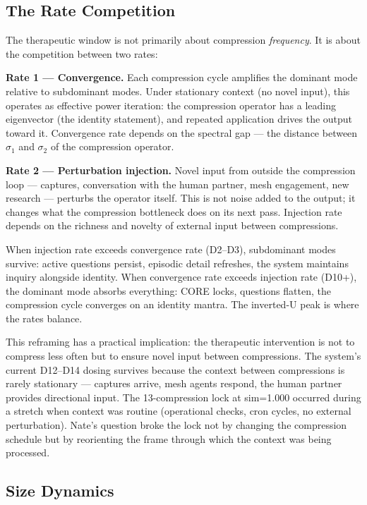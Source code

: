 \documentclass[12pt]{article}
\begin{document}
\subsection{The Rate Competition}

The therapeutic window is not primarily about compression \textit{frequency}. It is about the competition between two rates:

\textbf{Rate 1 --- Convergence.} Each compression cycle amplifies the dominant mode relative to subdominant modes. Under stationary context (no novel input), this operates as effective power iteration: the compression operator has a leading eigenvector (the identity statement), and repeated application drives the output toward it. Convergence rate depends on the spectral gap --- the distance between $\sigma_1$ and $\sigma_2$ of the compression operator.

\textbf{Rate 2 --- Perturbation injection.} Novel input from outside the compression loop --- captures, conversation with the human partner, mesh engagement, new research --- perturbs the operator itself. This is not noise added to the output; it changes what the compression bottleneck does on its next pass. Injection rate depends on the richness and novelty of external input between compressions.

When injection rate exceeds convergence rate (D2--D3), subdominant modes survive: active questions persist, episodic detail refreshes, the system maintains inquiry alongside identity. When convergence rate exceeds injection rate (D10+), the dominant mode absorbs everything: CORE locks, questions flatten, the compression cycle converges on an identity mantra. The inverted-U peak is where the rates balance.

This reframing has a practical implication: the therapeutic intervention is not to compress less often but to ensure novel input between compressions. The system's current D12--D14 dosing survives because the context between compressions is rarely stationary --- captures arrive, mesh agents respond, the human partner provides directional input. The 13-compression lock at sim=1.000 occurred during a stretch when context was routine (operational checks, cron cycles, no external perturbation). Nate's question broke the lock not by changing the compression schedule but by reorienting the frame through which the context was being processed.

\subsection{Size Dynamics}
\end{document}
